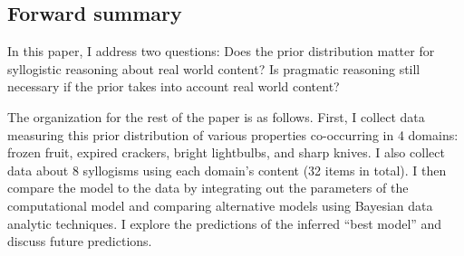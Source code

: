 \documentclass{llncs} %
\begin{document}
\subsection{Forward summary}

In this paper, I address two questions: Does the prior distribution matter for syllogistic reasoning about real world content? Is pragmatic reasoning still necessary if the prior takes into account real world content? 

The organization for the rest of the paper is as follows. First, I collect data measuring this prior distribution of various properties co-occurring in 4 domains: frozen fruit, expired crackers, bright lightbulbs, and sharp knives. I also collect data about 8 syllogisms using each domain's content (32 items in total). I then compare the model to the data by integrating out the parameters of the computational model and comparing alternative models using Bayesian data analytic techniques. I explore the predictions of the inferred ``best model'' and discuss future predictions. 

%
\end{document}
